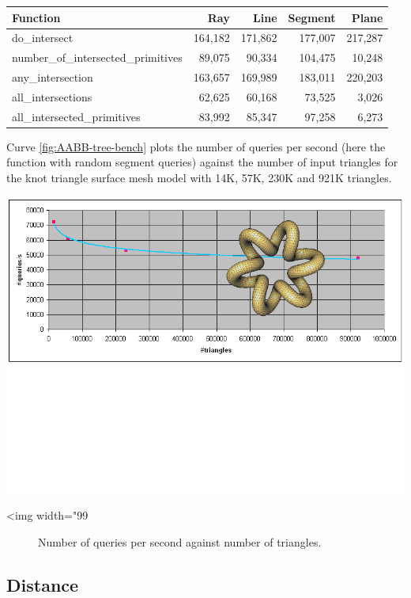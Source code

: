 \begin{tabular}{|l|r|r|r|r|}
  \hline
  Function                            &     Ray &    Line & Segment &   Plane \\
  \hline
  do\_intersect                       & 164,182 & 171,862 & 177,007 & 217,287 \\
  number\_of\_intersected\_primitives &  89,075 &  90,334 & 104,475 &  10,248 \\
  any\_intersection                   & 163,657 & 169,989 & 183,011 & 220,203 \\
  all\_intersections                  &  62,625 &  60,168 &  73,525 &   3,026 \\
  all\_intersected\_primitives        &  83,992 &  85,347 &  97,258 &   6,273 \\
  \hline
\end{tabular}

Curve \ref{fig:AABB-tree-bench} plots the number of queries per second (here the  function with random segment queries) against the number of input triangles for the knot triangle surface mesh model with 14K, 57K, 230K and 921K triangles.

\begin{center}
    \label{fig:AABB-tree-bench}
    \begin{ccTexOnly}
      \includegraphics[width=1.0\textwidth]{AABB_tree/bench}
    \end{ccTexOnly}
    \begin{ccHtmlOnly}
        <img width="99%
    \end{ccHtmlOnly}
    \begin{figure}[h]
        \caption{Number of queries per second against number of triangles.
                 }
    \end{figure}
\end{center}

\subsection{Distance}



